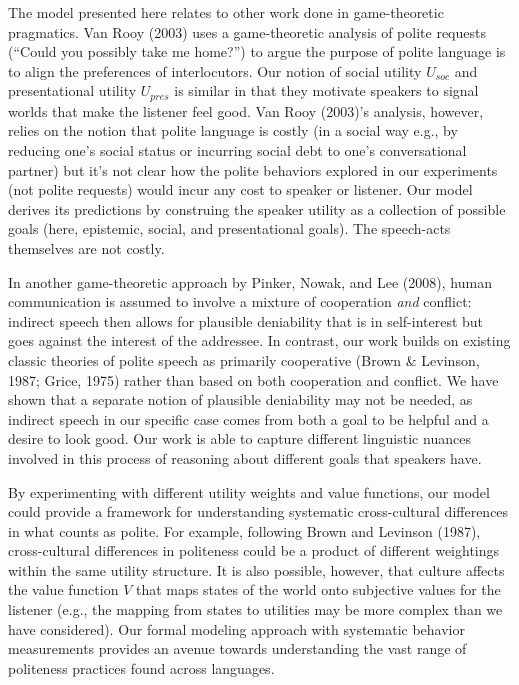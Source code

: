 \documentclass[floatsintext,mask,man]{apa6}
\theoremstyle{definition}
\theoremstyle{definition}
\theoremstyle{definition}
\theoremstyle{remark}
\begin{document}
The model presented here relates to other work done in game-theoretic
pragmatics. Van Rooy (2003) uses a game-theoretic analysis of polite
requests (\enquote{Could you possibly take me home?}) to argue the
purpose of polite language is to align the preferences of interlocutors.
Our notion of social utility \(U_{soc}\) and presentational utility
\(U_{pres}\) is similar in that they motivate speakers to signal worlds
that make the listener feel good. Van Rooy (2003)'s analysis, however,
relies on the notion that polite language is costly (in a social way
e.g., by reducing one's social status or incurring social debt to one's
conversational partner) but it's not clear how the polite behaviors
explored in our experiments (not polite requests) would incur any cost
to speaker or listener. Our model derives its predictions by construing
the speaker utility as a collection of possible goals (here, epistemic,
social, and presentational goals). The speech-acts themselves are not
costly.

In another game-theoretic approach by Pinker, Nowak, and Lee (2008),
human communication is assumed to involve a mixture of cooperation
\emph{and} conflict: indirect speech then allows for plausible
deniability that is in self-interest but goes against the interest of
the addressee. In contrast, our work builds on existing classic theories
of polite speech as primarily cooperative (Brown \& Levinson, 1987;
Grice, 1975) rather than based on both cooperation and conflict. We have
shown that a separate notion of plausible deniability may not be needed,
as indirect speech in our specific case comes from both a goal to be
helpful and a desire to look good. Our work is able to capture different
linguistic nuances involved in this process of reasoning about different
goals that speakers have.

By experimenting with different utility weights and value functions, our
model could provide a framework for understanding systematic
cross-cultural differences in what counts as polite. For example,
following Brown and Levinson (1987), cross-cultural differences in
politeness could be a product of different weightings within the same
utility structure. It is also possible, however, that culture affects
the value function \(V\) that maps states of the world onto subjective
values for the listener (e.g., the mapping from states to utilities may
be more complex than we have considered). Our formal modeling approach
with systematic behavior measurements provides an avenue towards
understanding the vast range of politeness practices found across
languages.
\end{document}
